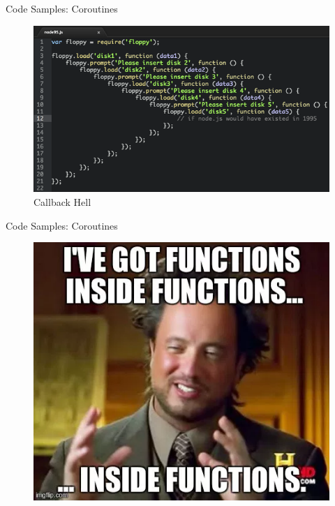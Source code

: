 \begin{frame}[fragile]{Code Samples: Coroutines}
	\begin{center}
		\begin{figure}
			\includegraphics[width=0.6\paperwidth]{figures/functionsInFunctionsFail}
			\caption{Callback Hell}
		\end{figure}
	\end{center}
\end{frame}

\begin{frame}[fragile]{Code Samples: Coroutines}
	\begin{center}
		\begin{figure}
			\includegraphics[width=0.5\paperwidth]{figures/functionsInFunctionsMeme}
		\end{figure}
	\end{center}
\end{frame}

